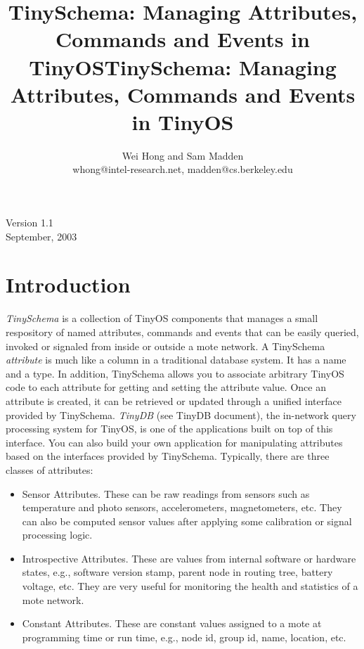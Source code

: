 \documentclass[11pt]{article}
\title{\vspace{2.5in} TinySchema: Managing Attributes, Commands and Events in TinyOS}
\title{TinySchema: Managing Attributes, Commands and Events in TinyOS}
\author{Wei Hong and Sam Madden \\
	whong@intel-research.net, madden@cs.berkeley.edu}
\date{}
\begin{document}

\maketitle
\begin{latexonly}
\vspace{2in}
\end{latexonly}
\begin{center}
Version 1.1 \\
September, 2003
\end{center}


\begin{latexonly}\newpage\end{latexonly}
\section{Introduction}

{\em TinySchema} is a collection of TinyOS components that manages
a small respository of named attributes, commands and events that can be
easily queried, invoked or signaled from inside or outside a mote network.
A TinySchema {\em attribute} is much like a column in a traditional database system.
It has a name and a type.  In addition, TinySchema allows you to
associate arbitrary TinyOS code to each attribute for getting
and setting the attribute value.  Once an attribute is created, it can
be retrieved or updated through a unified interface provided by TinySchema.
{\em TinyDB} (see TinyDB document), the in-network query
processing system for TinyOS, is one of the applications built on top
of this interface.  You can also build your own application for manipulating
attributes based on the interfaces provided by TinySchema.  Typically, there
are three classes of attributes:
\begin{itemize}
\item Sensor Attributes.  These can be raw readings from sensors such as
temperature and photo sensors, accelerometers, magnetometers, etc.
They can also be computed sensor values after applying some calibration
or signal processing logic.
\item Introspective Attributes.  These are values from internal
software or hardware states, e.g., software version stamp, parent node
in routing tree, battery voltage, etc.  They are very useful for
monitoring the health and statistics of a mote network.
\item Constant Attributes.  These are constant values assigned to
a mote at programming time or run time, e.g., node id, group id, name,
location, etc.
\end{itemize}
\end{document}
